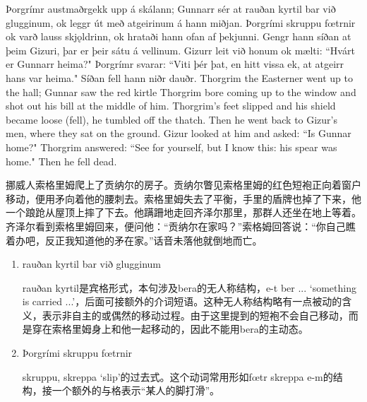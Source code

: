 \begin{paracol}{2}
    Þorgrímr austmaðr\footnotemark[1] gekk upp á skálann; Gunnarr sér at rauðan kyrtil bar við glugginum, ok leggr út með atgeirinum á hann miðjan. Þorgrími skruppu fœtrnir ok varð lauss skjǫldrinn, ok hrataði hann ofan af þekjunni. Gengr hann síðan at þeim Gizuri, þar er þeir sátu á vellinum. Gizurr leit við honum ok mælti: ``Hvárt er Gunnarr heima?" Þorgrímr svarar: ``Viti þér þat, en hitt vissa ek, at atgeirr hans var heima." Síðan fell hann niðr dauðr.
    \switchcolumn
    Thorgrim the Easterner went up to the hall; Gunnar saw the red kirtle Thorgrim bore coming up to the window and shot out his bill at the middle of him. Thorgrim's feet slipped and his shield became loose (fell), he tumbled off the thatch. Then he went back to Gizur's men, where they sat on the ground. Gizur looked at him and asked: ``Is Gunnar home?" Thorgrim answered: ``See for yourself, but I know this: his spear was home." Then he fell dead.
\end{paracol}
\begin{translation*}{}
    挪威人索格里姆爬上了贡纳尔的房子。贡纳尔瞥见索格里姆的红色短袍正向着窗户移动，便用矛向着他的腰刺去。索格里姆失去了平衡，手里的盾牌也掉了下来，他一个踉跄从屋顶上摔了下去。他蹒跚地走回齐泽尔那里，那群人还坐在地上等着。齐泽尔看到索格里姆回来，便问他：“贡纳尔在家吗？”索格姆回答说：“你自己瞧着办吧，反正我知道他的矛在家。”话音未落他就倒地而亡。
\end{translation*}
\begin{grammar*}{}
    \begin{enumerate}[leftmargin=*]
        \item rauðan kyrtil bar við glugginum

              rauðan kyrtil是宾格形式，本句涉及bera的无人称结构，e-t ber ... `something is carried ...'，后面可接额外的介词短语。这种无人称结构略有一点被动的含义，表示非自主的或偶然的移动过程。由于这里提到的短袍不会自己移动，而是穿在索格里姆身上和他一起移动的，因此不能用bera的主动态。

        \item Þorgrími skruppu fœtrnir

              skruppu, skreppa `slip'的过去式。这个动词常用形如fœtr skreppa e-m的结构，接一个额外的与格表示“某人的脚打滑”。
    \end{enumerate}
\end{grammar*}
